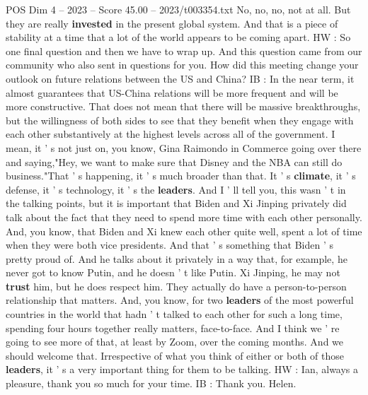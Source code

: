 \begin{textsample}{POS Dim 4 – 2023 – Score 45.00 – 2023/t003354.txt}
No, no, no, not at all.
But they are really \textbf{invested} in the present global system.
And that is a piece of stability at a time that a lot of the world appears to be coming apart.
HW : So one final question and then we have to wrap up.
And this question came from our community who also sent in questions for you.
How did this meeting change your outlook on future relations between the US and China?
IB : In the near term, it almost guarantees that US-China relations will be more frequent and will be more constructive.
That does not mean that there will be massive breakthroughs, but the willingness of both sides to see that they benefit when they engage with each other substantively at the highest levels across all of the government.
I mean, it ' s not just on, you know, Gina Raimondo in Commerce going over there and saying,"Hey, we want to make sure that Disney and the NBA can still do business."That ' s happening, it ' s much broader than that.
It ' s \textbf{climate}, it ' s defense, it ' s technology, it ' s the \textbf{leaders}.
And I ' ll tell you, this wasn ' t in the talking points, but it is important that Biden and Xi Jinping privately did talk about the fact that they need to spend more time with each other personally.
And, you know, that Biden and Xi knew each other quite well, spent a lot of time when they were both vice presidents.
And that ' s something that Biden ' s pretty proud of.
And he talks about it privately in a way that, for example, he never got to know Putin, and he doesn ' t like Putin.
Xi Jinping, he may not \textbf{trust} him, but he does respect him.
They actually do have a person-to-person relationship that matters.
And, you know, for two \textbf{leaders} of the most powerful countries in the world that hadn ' t talked to each other for such a long time, spending four hours together really matters, face-to-face.
And I think we ' re going to see more of that, at least by Zoom, over the coming months.
And we should welcome that.
Irrespective of what you think of either or both of those \textbf{leaders}, it ' s a very important thing for them to be talking.
HW : Ian, always a pleasure, thank you so much for your time.
IB : Thank you.
Helen.

\end{textsample}
